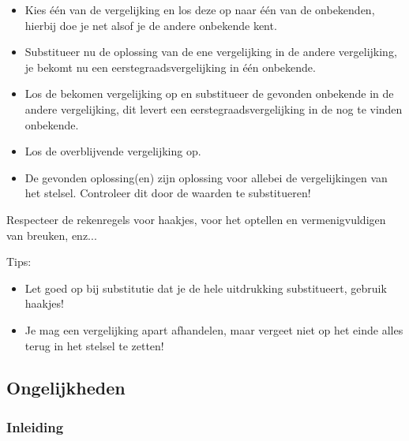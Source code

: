 \begin{ftonthoud}
	
\begin{itemize}
\item Kies \'{e}\'{e}n van de vergelijking en los deze op naar \'{e}\'{e}n van de onbekenden, hierbij doe je net alsof je de andere onbekende kent.
\item Substitueer nu de oplossing van de ene vergelijking in de andere vergelijking, je bekomt nu een eerstegraadsvergelijking in \'{e}\'{e}n onbekende.
\item Los de bekomen vergelijking op en substitueer de gevonden onbekende in de andere vergelijking, dit levert een eerstegraadsvergelijking in de nog te vinden onbekende.
\item Los de overblijvende vergelijking op.
\item De gevonden oplossing(en) zijn oplossing voor allebei de vergelijkingen van het stelsel. Controleer dit door de waarden te substitueren!
\end{itemize}

\begin{opmerking}
	Respecteer de rekenregels voor haakjes, voor het optellen en vermenigvuldigen van breuken, enz...
\end{opmerking}
\end{ftonthoud}


Tips:
\begin{framed}
\begin{itemize}
	\item Let goed op bij substitutie dat je de hele uitdrukking substitueert, gebruik haakjes!
	\item Je mag een vergelijking apart afhandelen, maar vergeet niet op het einde alles terug in het stelsel te zetten!
\end{itemize}
\end{framed}

\subsection{Ongelijkheden}


\subsubsection{Inleiding}

